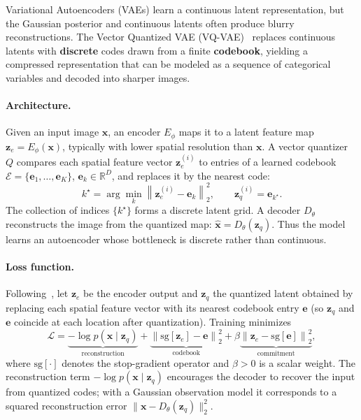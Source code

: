\documentclass{article}
\begin{document}
Variational Autoencoders (VAEs) learn a continuous latent representation, but the Gaussian posterior and continuous latents often produce blurry reconstructions.
The Vector Quantized VAE (VQ-VAE)~\cite{vqvae} replaces continuous latents with \textbf{discrete} codes drawn from a finite \textbf{codebook}, yielding a compressed representation that can be modeled as a sequence of categorical variables and decoded into sharper images.

\paragraph{Architecture.}
Given an input image $\mathbf{x}$, an encoder $E_\phi$ maps it to a latent feature map
$\mathbf{z}_e = E_\phi(\mathbf{x})$, typically with lower spatial resolution than $\mathbf{x}$.
A vector quantizer $Q$ compares each spatial feature vector $\mathbf{z}_e^{(i)}$ to entries of a learned codebook
$\mathcal{E} = \{\mathbf{e}_1, \ldots, \mathbf{e}_K\}$, $\mathbf{e}_k \in \mathbb{R}^D$,
and replaces it by the nearest code:
\[
    k^\star = \arg\min_k \left\| \mathbf{z}_e^{(i)} - \mathbf{e}_k \right\|_2^2,
    \qquad
    \mathbf{z}_q^{(i)} = \mathbf{e}_{k^\star}.
\]
The collection of indices $\{k^\star\}$ forms a discrete latent grid.
A decoder $D_\theta$ reconstructs the image from the quantized map:
$\hat{\mathbf{x}} = D_\theta(\mathbf{z}_q)$.
Thus the model learns an autoencoder whose bottleneck is discrete rather than continuous.

\paragraph{Loss function.}
Following~\cite{vqvae}, let $\mathbf{z}_e$ be the encoder output and $\mathbf{z}_q$ the quantized latent obtained by replacing each spatial feature vector with its nearest codebook entry $\mathbf{e}$ (so $\mathbf{z}_q$ and $\mathbf{e}$ coincide at each location after quantization).
Training minimizes
\begin{equation}
    \mathcal{L}
    = \underbrace{-\log p(\mathbf{x} \mid \mathbf{z}_q)}_{\text{reconstruction}}
      + \underbrace{\left\| \mathrm{sg}[\mathbf{z}_e] - \mathbf{e} \right\|_2^2}_{\text{codebook}}
      + \beta \underbrace{\left\| \mathbf{z}_e - \mathrm{sg}[\mathbf{e}] \right\|_2^2}_{\text{commitment}},
    \label{eq:vqvae-loss}
\end{equation}
where $\mathrm{sg}[\cdot]$ denotes the stop-gradient operator and $\beta > 0$ is a scalar weight.
The reconstruction term $-\log p(\mathbf{x} \mid \mathbf{z}_q)$ encourages the decoder to recover the input from quantized codes; with a Gaussian observation model it corresponds to a squared reconstruction error $\|\mathbf{x} - D_\theta(\mathbf{z}_q)\|_2^2$.
\end{document}
